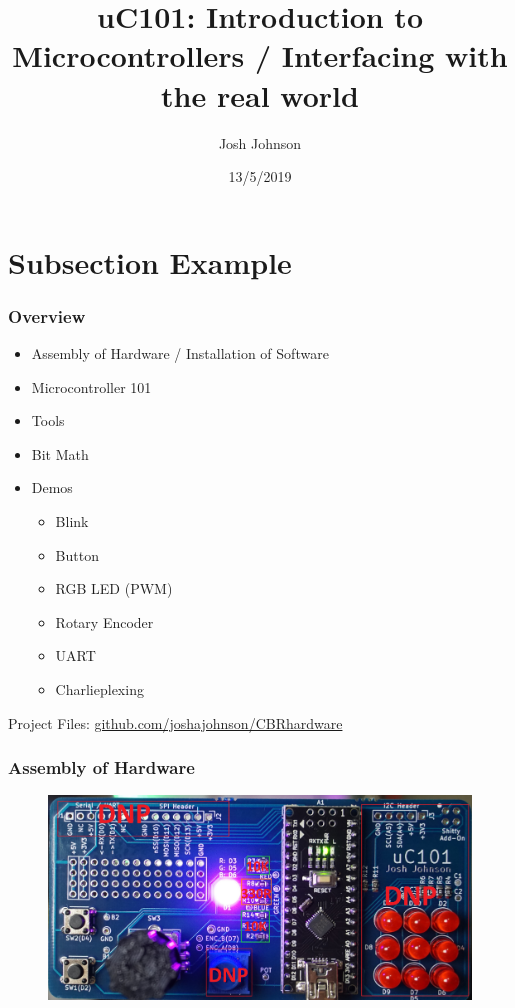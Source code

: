 \documentclass[t]{beamer}
\title[uC101]{uC101: Introduction to Microcontrollers / Interfacing with the real world} %
\author{Josh Johnson} %
\institute[] %
{ \\ %
\medskip
\textit{} %
}
\date{13/5/2019} %
\begin{document}
\begin{frame}
\titlepage %
\end{frame}


\section{Subsection Example} %

\begin{frame}
\frametitle{Overview}
\begin{itemize}
\item Assembly of Hardware / Installation of Software
\item Microcontroller 101
\item Tools
\item Bit Math
\item Demos
\begin{itemize}
	\item Blink
	\item Button
	\item RGB LED (PWM)
	\item Rotary Encoder
	\item UART
	\item Charlieplexing
\end{itemize}
	

\end{itemize}
\vspace{20mm}
Project Files: \url{github.com/joshajohnson/CBRhardware}\\
\end{frame}


\begin{frame}[t]
\frametitle{Assembly of Hardware}

\begin{figure}
	\includegraphics[width=1\linewidth]{hardware.jpg}
\end{figure}

\end{frame}
\end{document}
